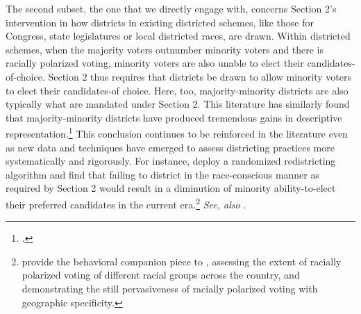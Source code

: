 \documentclass[12pt]{article}
\begin{document}
The second subset, the one that we directly engage with, concerns Section 2's intervention in how districts in existing districted schemes, like those for Congress, state legislatures or local districted races, are drawn.  Within districted schemes, when the majority voters outnumber minority voters and there is racially polarized voting, minority voters are also unable to elect their candidates-of-choice.  Section 2 thus requires that districts be drawn to allow minority voters to elect their candidates-of choice.  Here, too, majority-minority districts are also typically what are mandated under Section 2.  This literature has similarly found that majority-minority districts have produced tremendous gains in descriptive representation.\footnote{\cite{grofman1989minority,grofman1991impact,sass1995voting,grofman2000drawing,lublin2009has,lublin2020minority}.} This conclusion continues to be reinforced in the literature even as new data and techniques have emerged to assess districting practices more systematically and rigorously. For instance, \cite{chen2021race} deploy a randomized redistricting algorithm and find that failing to district in the race-conscious manner as required by Section 2 would result in a diminution of minority ability-to-elect their preferred candidates in the current era.\footnote{\cite{kuriwaki2023geography} provide the behavioral companion piece to \cite{chen2021race}, assessing the extent of racially polarized voting of different racial groups across the country, and demonstrating the still pervasiveness of racially polarized voting with geographic specificity.} \textit{See, also} \cite{katz2005documenting}.
\end{document}
